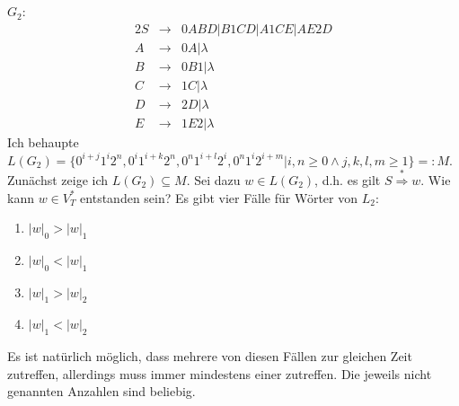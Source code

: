 \documentclass[10pt,a4paper,oneside,ngerman,numbers=noenddot]{scrartcl}
\begin{document}
\subsection{} %
$G_{2}$:\\
\begin{alignat*}{2}
S &\rightarrow & 0ABD | B1CD | A1CE | AE2D \\
A &\rightarrow & 0A | \lambda \\
B &\rightarrow & 0B1 | \lambda \\
C &\rightarrow & 1C | \lambda \\
D &\rightarrow & 2D | \lambda \\
E &\rightarrow & 1E2 | \lambda
\end{alignat*}
Ich behaupte $L(G_{2}) = \{0^{i + j}1^{i}2^{n}, 0^{i}1^{i + k}2^{n}, 0^{n}1^{i + l}2^{i}, 0^{n}1^{i}2^{i + m}|i,n \geq 0 \wedge j,k,l,m \geq 1\} =: M$.\\
Zunächst zeige ich $L(G_{2}) \subseteq M$. Sei dazu $w \in L(G_{2})$, d.h. es gilt $S \overset{*}{\Longrightarrow} w$. Wie kann $w \in V_{T}^{*}$ entstanden sein? Es gibt vier Fälle für Wörter von $L_{2}$:
\begin{enumerate}
	\item $|w|_{0} > |w|_{1}$ \\
	\item $|w|_{0} < |w|_{1}$ \\
	\item $|w|_{1} > |w|_{2}$ \\
	\item $|w|_{1} < |w|_{2}$
\end{enumerate}
Es ist natürlich möglich, dass mehrere von diesen Fällen zur gleichen Zeit zutreffen, allerdings muss immer mindestens einer zutreffen. Die jeweils nicht genannten Anzahlen sind beliebig.
\end{document}
